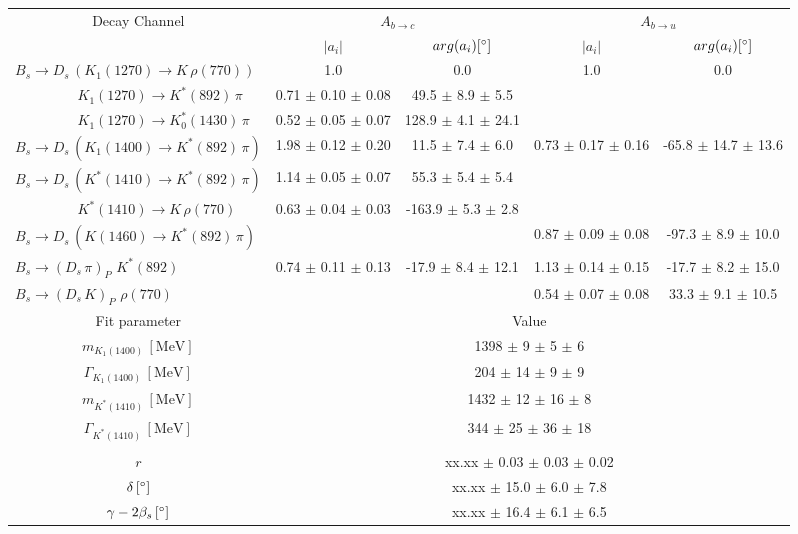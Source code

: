\begin{tabular}{l c c c c } 
\hline
\hline
\multicolumn{1}{c}{Decay Channel} & \multicolumn{2}{c}{$A_{b \to c}$} & \multicolumn{2}{c}{$A_{b \to u}$}  \\ 
 & \multicolumn{1}{c}{$\vert a_i \vert$}  & \multicolumn{1}{c}{$arg(a_i) [^{\circ}]$}  & \multicolumn{1}{c}{$\vert a_i \vert$} & \multicolumn{1}{c}{$arg(a_i) [^{\circ}]$} \\ 
\hline
 $B_s \to D_s \, ( K_1(1270) \to K \, \rho(770) ) $ &  1.0 & 0.0 & 1.0 & 0.0  \\ 
$\phantom{B_s \to D_s \, (} K_1(1270) \to K^{*}(892) \, \pi \phantom{)} $ & 0.71 $\pm$ 0.10 $\pm$ 0.08 & 49.5 $\pm$ 8.9 $\pm$ 5.5 & &   \\ 
$\phantom{B_s \to D_s \, (} K_1(1270) \to K^{*}_{0}(1430) \, \pi \phantom{)} $ & 0.52 $\pm$ 0.05 $\pm$ 0.07 & 128.9 $\pm$ 4.1 $\pm$ 24.1 & &   \\ 
$B_s \to D_s \, ( K_1(1400) \to K^{*}(892) \, \pi ) $ & 1.98 $\pm$ 0.12 $\pm$ 0.20 & 11.5 $\pm$ 7.4 $\pm$ 6.0 & 0.73 $\pm$ 0.17 $\pm$ 0.16 & -65.8 $\pm$ 14.7 $\pm$ 13.6 \\ 
$B_s \to D_s \, ( K^{*}(1410) \to K^{*}(892) \, \pi ) $ & 1.14 $\pm$ 0.05 $\pm$ 0.07 & 55.3 $\pm$ 5.4 $\pm$ 5.4 &  &  \\ 
$\phantom{B_s \to D_s \, (} K^{*}(1410) \to K \, \rho(770) \phantom{)} $ & 0.63 $\pm$ 0.04 $\pm$ 0.03 & -163.9 $\pm$ 5.3 $\pm$ 2.8 & &   \\ 
$B_s \to D_s \, ( K(1460) \to K^{*}(892) \, \pi ) $ & & &0.87 $\pm$ 0.09 $\pm$ 0.08 & -97.3 $\pm$ 8.9 $\pm$ 10.0 \\ 
$B_s \to ( D_s \, \pi)_{P} \, \, K^{*}(892) $ & 0.74 $\pm$ 0.11 $\pm$ 0.13 & -17.9 $\pm$ 8.4 $\pm$ 12.1 & 1.13 $\pm$ 0.14 $\pm$ 0.15 & -17.7 $\pm$ 8.2 $\pm$ 15.0 \\ 
$B_s \to ( D_s \, K)_{P} \, \, \rho(770) $ & & &0.54 $\pm$ 0.07 $\pm$ 0.08 & 33.3 $\pm$ 9.1 $\pm$ 10.5 \\ 
\hline
\hline
\multicolumn{1}{c}{Fit parameter} & \multicolumn{4}{c}{Value}  \\ 
\hline
\multicolumn{1}{c}{$m_{K_1(1400)} \, [\text{MeV}]$} & \multicolumn{4}{c}{1398 $\pm$ 9 $\pm$ 5 $\pm$ 6} \\ 
\multicolumn{1}{c}{$\Gamma_{K_1(1400)} \, [\text{MeV}]$} & \multicolumn{4}{c}{204 $\pm$ 14 $\pm$ 9 $\pm$ 9} \\ 
\multicolumn{1}{c}{$m_{K^{*}(1410)} \, [\text{MeV}]$} & \multicolumn{4}{c}{1432 $\pm$ 12 $\pm$ 16 $\pm$ 8} \\ 
\multicolumn{1}{c}{$\Gamma_{K^{*}(1410)} \, [\text{MeV}]$} & \multicolumn{4}{c}{344 $\pm$ 25 $\pm$ 36 $\pm$ 18} \\ 
 \\ 
\multicolumn{1}{c}{$r$} & \multicolumn{4}{c}{xx.xx $\pm$ 0.03 $\pm$ 0.03 $\pm$ 0.02} \\ 
\multicolumn{1}{c}{$\delta \, [^{\circ}]$} & \multicolumn{4}{c}{xx.xx $\pm$ 15.0 $\pm$ 6.0 $\pm$ 7.8} \\ 
\multicolumn{1}{c}{$\gamma - 2 \beta_{s} \, [^{\circ}]$} & \multicolumn{4}{c}{xx.xx $\pm$ 16.4 $\pm$ 6.1 $\pm$ 6.5} \\ 
\hline
\hline
\end{tabular}

